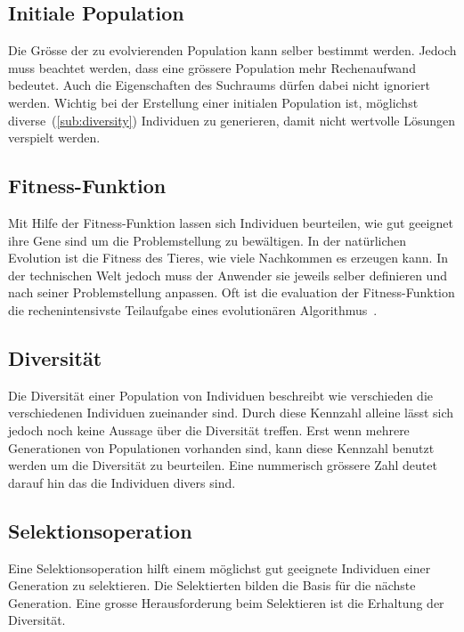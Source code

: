     \subsection{Initiale Population}
      Die Grösse der zu evolvierenden Population kann selber bestimmt werden.
      Jedoch muss beachtet werden, dass eine grössere Population mehr Rechenaufwand bedeutet.
      Auch die Eigenschaften des Suchraums dürfen dabei nicht ignoriert werden.
      Wichtig bei der Erstellung einer initialen Population ist, möglichst diverse~(\vref{sub:diversity}) Individuen zu generieren,
      damit nicht wertvolle Lösungen verspielt werden.

    \subsection{Fitness-Funktion}

      Mit Hilfe der Fitness-Funktion lassen sich Individuen beurteilen,
      wie gut geeignet ihre Gene sind um die Problemstellung zu bewältigen.
      In der natürlichen Evolution ist die Fitness des Tieres, wie viele Nachkommen es erzeugen kann.
      In der technischen Welt jedoch muss der Anwender sie jeweils selber definieren und
      nach seiner Problemstellung anpassen. Oft ist die evaluation der Fitness-Funktion
      die rechenintensivste Teilaufgabe eines evolutionären Algorithmus~\cite[S.22]{book:bioInspired}.

    \subsection{Diversität\label{sub:diversity}}
      Die Diversität einer Population von Individuen beschreibt wie verschieden die verschiedenen Individuen zueinander sind.
      Durch diese Kennzahl alleine lässt sich jedoch noch keine Aussage über die Diversität treffen.
      Erst wenn mehrere Generationen von Populationen vorhanden sind, kann diese Kennzahl benutzt werden um die Diversität zu beurteilen.
      Eine nummerisch grössere Zahl deutet darauf hin das die Individuen divers sind.



    \subsection{Selektionsoperation}

      Eine Selektionsoperation hilft einem möglichst gut geeignete Individuen einer Generation zu selektieren.
      Die Selektierten bilden die Basis für die nächste Generation.
      Eine grosse Herausforderung beim Selektieren ist die Erhaltung der Diversität.
